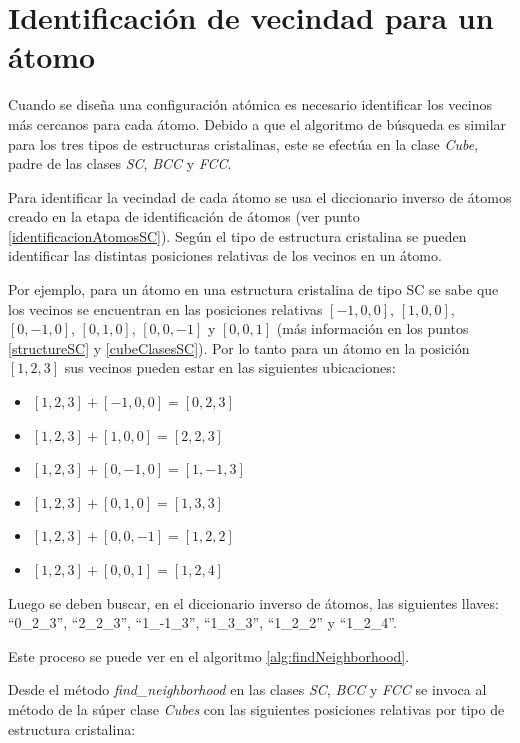 \section{Identificación de vecindad para un átomo}
\label{section:identificacionVecindad}

Cuando se diseña una configuración atómica es necesario identificar los vecinos más cercanos para cada átomo. Debido a que el algoritmo de búsqueda es similar para los tres tipos de estructuras cristalinas, este se efectúa en la clase \emph{Cube}, padre de las clases \emph{SC}, \emph{BCC} y \emph{FCC}.

Para identificar la vecindad de cada átomo se usa el diccionario inverso de átomos creado en la etapa de identificación de átomos (ver punto \ref{identificacionAtomosSC}). Según el tipo de estructura cristalina se pueden identificar las distintas posiciones relativas de los vecinos en un átomo.

Por ejemplo, para un átomo en una estructura cristalina de tipo SC se sabe que los vecinos se encuentran en las posiciones relativas $[-1,0,0]$, $[1,0,0]$, $[0,-1,0]$, $[0,1,0]$, $[0,0,-1]$ y $[0,0,1]$ (más información en los puntos \ref{structureSC} y \ref{cubeClasesSC}). Por lo tanto para un átomo en la posición $[1, 2, 3]$ sus vecinos pueden estar en las siguientes ubicaciones:

\begin{itemize}
  \item $[1, 2, 3] + [-1, 0, 0] = [0, 2, 3]$
  \item $[1, 2, 3] + [1, 0, 0] = [2, 2, 3]$
  \item $[1, 2, 3] + [0, -1, 0] = [1, -1, 3]$
  \item $[1, 2, 3] + [0, 1, 0] = [1, 3, 3]$
  \item $[1, 2, 3] + [0, 0, -1] = [1, 2, 2]$
  \item $[1, 2, 3] + [0, 0, 1] = [1, 2, 4]$
\end{itemize}

Luego se deben buscar, en el diccionario inverso de átomos, las siguientes llaves: ``0\_2\_3'', ``2\_2\_3'', ``1\_-1\_3'', ``1\_3\_3'', ``1\_2\_2'' y ``1\_2\_4''.

Este proceso se puede ver en el algoritmo \ref{alg:findNeighborhood}.

Desde el método \emph{find\_neighborhood} en las clases \emph{SC}, \emph{BCC} y \emph{FCC} se invoca al método de la súper clase \emph{Cubes} con las siguientes posiciones relativas por tipo de estructura cristalina:

